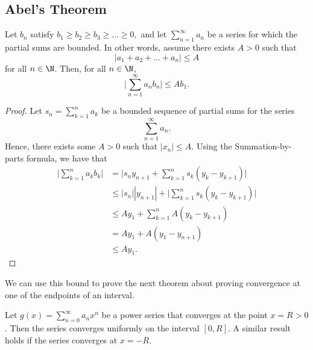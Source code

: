 \subsection{Abel's Theorem}

\begin{tcolorbox}
    \begin{lem}
    Let \( b_n  \) satisfy \( b_1 \geq b_2 \geq b_3 \geq \dots \geq 0,  \) and  let \( \sum_{ n=1 }^{ \infty  } a_n  \) be a series for which the partial sums are bounded. In other words, assume there exists \( A > 0  \) such that 
    \[  | a_1 + a_2 + \dots + a_n  |  \leq A  \] for all \( n \in \N  \). Then, for all \( n \in \N  \), 
    \[  \Big| \sum_{ n=1 }^{ \infty  } a_n b_n  \Big|  \leq Ab_1. \]
    \end{lem}
\end{tcolorbox}

\begin{proof}
Let \( s_n = \sum_{ k=1 }^{ n  } a_k  \) be a bounded sequence of partial sums for the series 
\[  \sum_{ n=1  }^{  \infty  } a_n.  \] Hence, there exists some \( A > 0  \) such that \( | x_n  | \leq A  \). Using the Summation-by-parts formula, we have that 
\begin{align*}
    \Big| \sum_{ k=1 }^{ n } a_k b_k  \Big| &= \Big| s_n y_{n+1} + \sum_{ k=1 }^{ n } s_k (y_k - y_{k+1}) \Big|  \\
                                            &\leq | s_n | | y_{n+1} | + \Big| \sum_{ k=1 }^{ n } s_k (y_k - y_{k+1}) \Big| \\
                                            &\leq Ay_1 + \sum_{ k=1 }^{ n } A (y_k - y_{k+1}) \\
                                            &= Ay_1 + A(y_1 - y_{n+1}) \\
                                            &\leq Ay_1.
\end{align*}
\end{proof}

We can use this bound to prove the next theorem about proving convergence at one of the endpoints of an interval.

\begin{tcolorbox}
    \begin{thm}
        Let \( g(x) = \sum_{ n=0  }^{  \infty  } a_n x^n  \) be a power series that converges at the point \( x = R > 0  \). Then the series converges uniformly on the interval \( [0,R] \). A similar result holds if the series converges at \( x = -R  \).
    \end{thm}
\end{tcolorbox}

